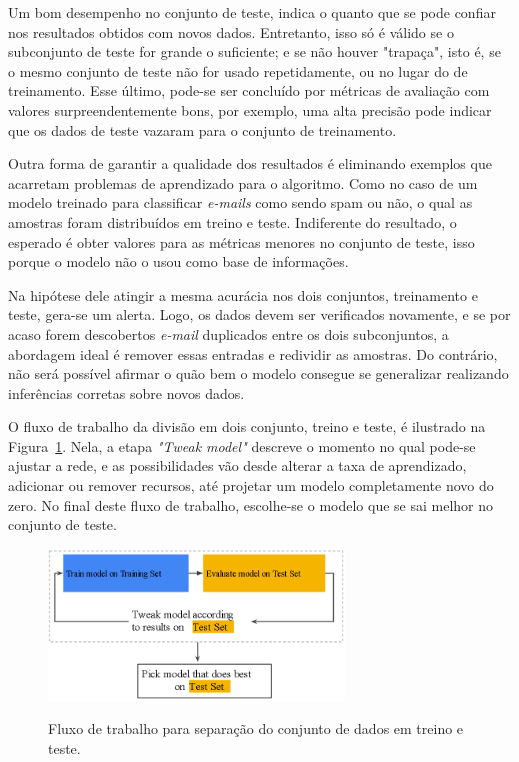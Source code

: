             Um bom desempenho no conjunto de teste, indica o quanto que se pode confiar nos resultados obtidos com novos dados. Entretanto, isso só é válido se o subconjunto de teste for grande o suficiente; e se não houver "trapaça", isto é, se o mesmo conjunto de teste não for usado repetidamente, ou no lugar do de treinamento. Esse último, pode-se ser concluído por métricas de avaliação com valores surpreendentemente bons, por exemplo, uma alta precisão pode indicar que os dados de teste vazaram para o conjunto de treinamento.
            
            Outra forma de garantir a qualidade dos resultados é eliminando exemplos que acarretam problemas de aprendizado para o algoritmo. Como no caso de um modelo treinado para classificar \textit{e-mails} como sendo spam ou não, o qual as amostras foram distribuídos em treino e teste. Indiferente do resultado, o esperado é obter valores para as métricas menores no conjunto de teste, isso porque o modelo não o usou como base de informações. 
            
            Na hipótese dele atingir a mesma acurácia nos dois conjuntos, treinamento e teste, gera-se um alerta. Logo, os dados devem ser verificados novamente, e se por acaso forem descobertos \textit{e-mail} duplicados entre os dois subconjuntos, a abordagem ideal é remover essas entradas e redividir as amostras. Do contrário, não será possível afirmar o quão bem o modelo consegue se generalizar realizando inferências  corretas sobre novos dados.     
            
            O fluxo de trabalho da divisão em dois conjunto, treino e teste, é ilustrado na Figura~\ref{fig:fluxo_treino_teste}. Nela, a etapa \textit{"Tweak model"} descreve o momento no qual pode-se ajustar a rede, e as possibilidades vão desde alterar a taxa de aprendizado, adicionar ou remover recursos, até projetar um modelo completamente novo do zero. No final deste fluxo de trabalho, escolhe-se o modelo que se sai melhor no conjunto de teste.
    
            \begin{figure}[H]
                \centering
                \caption{Fluxo de trabalho para separação do conjunto de dados em treino e teste.}
                \includegraphics[width=0.7\textwidth]{fig/2-fundamentacao/overfitting/fluxo_treino_teste.png}
                \label{fig:fluxo_treino_teste}
            \end{figure}
            
